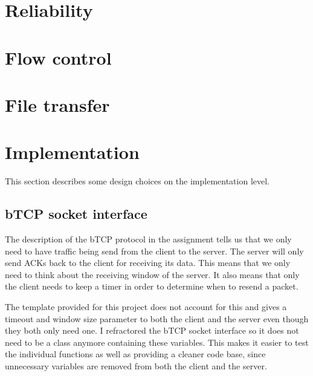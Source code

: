 \documentclass[a4paper]{article}
\begin{document}
\section{Reliability}

\section{Flow control}

\section{File transfer}

\section{Implementation}
This section describes some design choices on the implementation level.

	\subsection{bTCP socket interface}
	The description of the bTCP protocol in the assignment tells us that we only need to have traffic being send from the client to the server. The server will only send ACKs back to the client for receiving its data. This means that we only need to think about the receiving window of the server. It also means that only the client needs to keep a timer in order to determine when to resend a packet.

	The template provided for this project does not account for this and gives a timeout and window size parameter to both the client and the server even though they both only need one. I refractored the bTCP socket interface so it does not need to be a class anymore containing these variables. This makes it easier to test the individual functions as well as providing a cleaner code base, since unnecessary variables are removed from both the client and the server.
\end{document}
